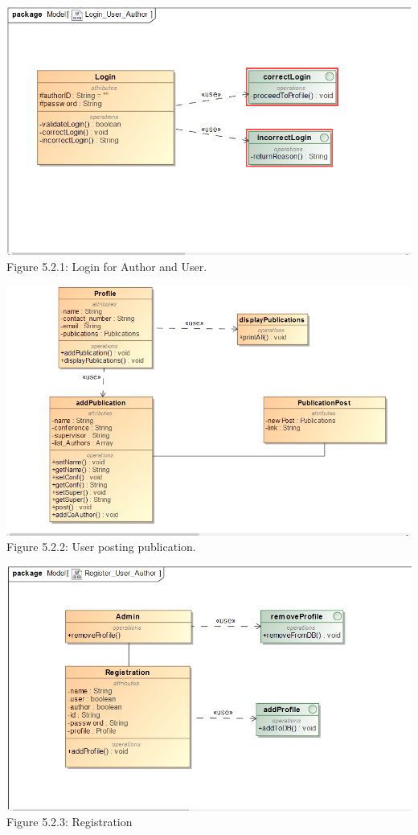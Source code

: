 \documentclass[hidelinks,a4paper,12pt]{article}
\begin{document}
	\includegraphics[width=1\textwidth]{./Graphs/Login.png}\\[0.4cm]  
	
	Figure 5.2.1: Login for Author and User.
	
	\includegraphics[width=1\textwidth]{./Graphs/Posting.png}\\[0.4cm]  
	
	Figure 5.2.2: User posting publication.
	
	
	\includegraphics[width=1\textwidth]{./Graphs/Registration.png}\\[0.4cm]  
	Figure 5.2.3: Registration
	
\end{document}
